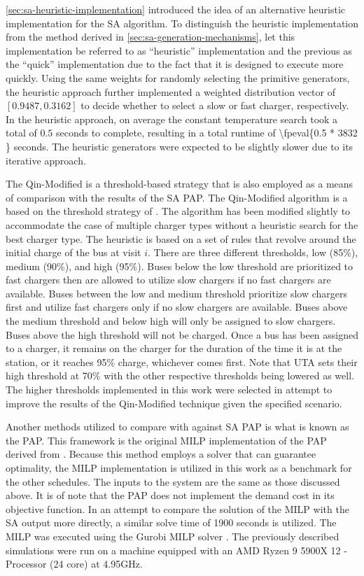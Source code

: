 \documentclass[energies,article,submit,moreauthors]{Definitions/mdpi}
\newcommand{\tempcnt}{3832 }                                                    %
\newcommand{\heuristiclocal}{0.5 }                                              %
\begin{document}
\ref{sec:sa-heuristic-implementation} introduced the idea of an alternative heuristic implementation for the SA algorithm. To
distinguish the heuristic implementation from the method derived in \ref{sec:sa-generation-mechanisms}, let this
implementation be referred to as ``heuristic'' implementation and the previous as the ``quick'' implementation due to the
fact that it is designed to execute more quickly. Using the same weights for randomly selecting the primitive
generators, the heuristic approach further implemented a weighted distribution vector of \([0.9487, 0.3162]\) to decide
whether to select a slow or fast charger, respectively. In the heuristic approach, on average the constant temperature
search took a total of \(\heuristiclocal\) seconds to complete, resulting in a total runtime of
\num{\fpeval{\heuristiclocal * \tempcnt}} seconds. The heuristic generators were expected to be slightly
slower due to its iterative approach.

The Qin-Modified is a threshold-based strategy that is also employed as a means of comparison with the results of the SA
PAP. The Qin-Modified algorithm is a based on the threshold strategy of \cite{qin-2016-numer-analy}. The algorithm has
been modified slightly to accommodate the case of multiple charger types without a heuristic search for the best charger
type. The heuristic is based on a set of rules that revolve around the initial charge of the bus at visit \(i\). There are
three different thresholds, low (85\%), medium (90\%), and high (95\%). Buses below the low threshold are prioritized to
fast chargers then are allowed to utilize slow chargers if no fast chargers are available. Buses between the low and
medium threshold prioritize slow chargers first and utilize fast chargers only if no slow chargers are available. Buses
above the medium threshold and below high will only be assigned to slow chargers. Buses above the high threshold will
not be charged. Once a bus has been assigned to a charger, it remains on the charger for the duration of the time it is
at the station, or it reaches 95\% charge, whichever comes first. Note that UTA sets their high threshold at 70\% with the
other respective thresholds being lowered as well. The higher thresholds implemented in this work were selected in
attempt to improve the results of the Qin-Modified technique given the specified scenario.

Another methods utilized to compare with against SA PAP is what is known as the PAP. This framework is the original
MILP implementation of the PAP derived from \cite{qarebagh-2019-optim-sched}. Because this method employs a solver that
can guarantee optimality, the MILP implementation is utilized in this work as a benchmark for the other schedules. The
inputs to the system are the same as those discussed above. It is of note that the PAP does not implement the
demand cost in its objective function. In an attempt to compare the solution of the MILP with the SA output more
directly, a similar solve time of 1900 seconds is utilized. The MILP was executed using the Gurobi MILP solver
\cite{gurobi-2021-gurob-optim}. The previously described simulations were run on a machine equipped with an AMD Ryzen 9
5900X 12 - Processor (24 core) at 4.95GHz.
\end{document}
